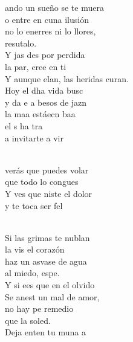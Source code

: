 \documentclass[12pt]{article}
\begin{document}
\begin{multicols*}{2}
\begin{cancion}%
	ando un sueño se te muera\\
	o entre en cuna ilusión\\
	no lo enerres ni lo llores, \\
	resutalo. \\
	Y jas des por perdida \\
	la par, cree en ti\\
	Y aunque elan, las heridas curan. \\
	Hoy el dha vida busc\\
	y  da e a besos de jazn \\
	la maa estáecn baa  \\
	el s  ha tra \\
	a invitarte a vir\\\jump\\
	\begin{chorus}%
	verás que puedes volar\\
	que todo lo congues\\
	Y ves que niste el dolor \\
	y te toca ser fel\\
	\end{chorus}%
	\jump\\
	Si las grimas te nublan \\
	la vis el corazón\\
	haz un asvase de agua\\
	al miedo, espe.\\
	Y si ees que en el olvido\\
	Se anest un mal de amor,\\
	no hay pe remedio\\
	que la soled.\\
	Deja enten tu muna a\\

\end{cancion}
\end{multicols*}
\end{document}
